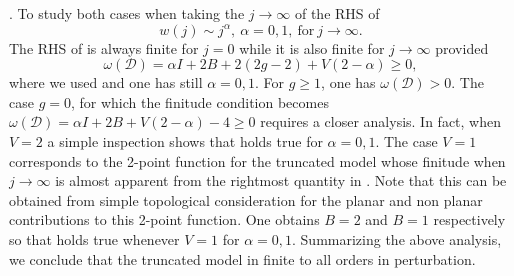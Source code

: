 \documentclass[10pt]{book}
\theoremstyle{break}
\begin{document}
. To study both cases when taking the $j\to\infty$ of the RHS of %
\begin{equation}
w(j)\sim j^\alpha,\ \alpha=0,1,\ {\text{for}}\  j\to\infty.%
\end{equation}
The RHS of %
is always finite for $j=0$ while it is also finite for $j\to\infty$ provided%
\begin{equation}
\omega(\mathcal{D})=\alpha I+2B+2(2g-2)+V(2-\alpha)\ge0,%
\end{equation}
where we used %
and one has still $\alpha=0,1$. For $g\ge1$, one has $\omega(\mathcal{D})>0$. The case $g=0$, for which the finitude condition %
becomes $\omega(\mathcal{D})=\alpha I+2B+V(2-\alpha)-4\ge0$ requires a closer analysis. In fact, when $V=2$ a simple inspection shows that %
holds true for $\alpha=0,1$. The case $V=1$ corresponds to the 2-point function for the truncated model whose finitude when $j\to\infty$ is almost apparent from the rightmost quantity in %
. Note that this can be obtained from simple topological consideration for the planar and non planar contributions to this 2-point function. One obtains $B=2$ and $B=1$ respectively so that %
holds true whenever $V=1$ for $\alpha=0,1$. Summarizing the above analysis, we conclude that the truncated model in finite to all orders in perturbation.\par
\end{document}

